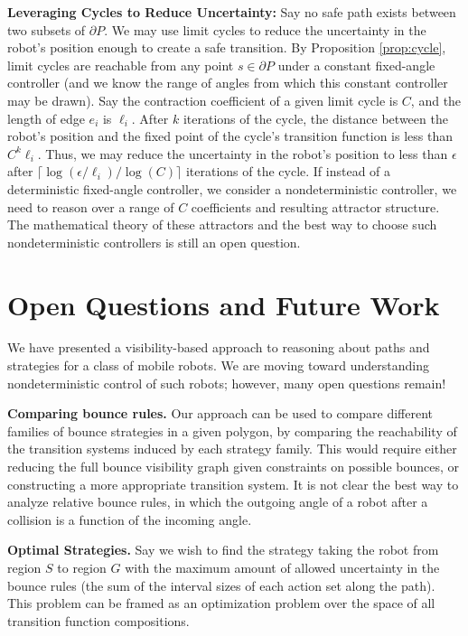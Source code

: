 \documentclass[]{styles/svproc}  %
\begin{document}
\textbf{Leveraging Cycles to Reduce Uncertainty:}
Say no safe path exists between two subsets of $\partial P$. We may
use limit cycles to reduce the uncertainty in the robot's position enough to
create a safe transition. By Proposition \ref{prop:cycle}, limit cycles are reachable from any point $s
\in \partial P$ under a constant fixed-angle controller (and we know the range
of angles from which this constant controller may be drawn). Say the contraction 
coefficient of a given limit cycle is $C$, and the length of edge $e_i$ is
$\ell_i$. After $k$ iterations of the cycle,
the distance between the robot's position and the fixed point of the cycle's transition
function is less than $C^k \ell_i$. Thus,
we may reduce the uncertainty in the robot's position to less than $\epsilon$
after $\lceil \log(\epsilon/\ell_i)/\log(C) \rceil$ iterations of the 
cycle. If instead of a deterministic fixed-angle controller, we consider a
nondeterministic controller, we need to
reason over a range of $C$ coefficients and resulting attractor structure. 
The mathematical theory of these attractors and the best way to choose such
nondeterministic controllers is still an open question.


\section{Open Questions and Future Work}

We have presented a visibility-based approach to reasoning about 
paths and strategies for a class of mobile robots. We are moving toward
understanding nondeterministic control of such robots; however, many open
questions remain!

\textbf{Comparing bounce rules.} Our approach can be used to compare different families of
bounce strategies in a given polygon, by comparing the reachability of the
transition systems induced by each strategy family. This would require 
either reducing the full bounce visibility graph given constraints on
possible bounces, or constructing a more appropriate transition
system. It is not clear the best way to analyze relative bounce rules, in which the
outgoing angle of a robot after a collision is a function of the incoming angle.


\textbf{Optimal Strategies.} Say we wish to
find the strategy taking the robot from region $S$ to region $G$ with the
maximum amount of allowed uncertainty in the bounce rules (the sum of the
interval sizes of each action set along the path). This problem can be framed as
an optimization problem over the space of all transition function compositions.
\end{document}
